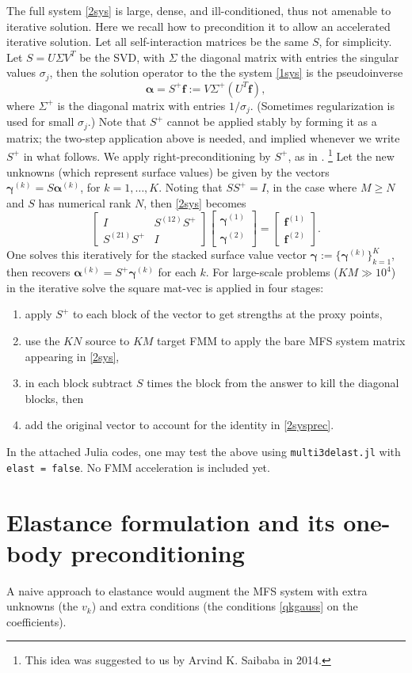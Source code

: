 \documentclass[10pt]{article}
\newcommand{\ben}{\begin{enumerate}}
\newcommand{\een}{\end{enumerate}}
\newcommand{\be}{\begin{equation}}
\newcommand{\ee}{\end{equation}}
\newcommand{\vt}[2]{\left[\begin{array}{r}#1\\#2\end{array}\right]} %
\newcommand{\mt}[4]{\left[\begin{array}{rr}#1&#2\\#3&#4\end{array}\right]} %
\newcommand{\f}{\mathbf{f}}
\newcommand{\bal}{\bm{\alpha}}
\newcommand{\bga}{\bm{\gamma}}
\newcommand{\ok}{^{(k)}}
\begin{document}
The full system \eqref{2sys} is large, dense, and ill-conditioned,
thus not amenable to iterative solution.
Here we recall how to precondition it to allow an accelerated iterative
solution.
Let all self-interaction matrices be the same $S$, for simplicity.
Let $S = U \Sigma V^T$ be the SVD,
with $\Sigma$ the diagonal matrix with entries the singular values $\sigma_j$,
then
the solution operator to the the system \eqref{1sys}
is the pseudoinverse
$$
\bal = S^+ \f := V \Sigma^+ (U^T \f),
$$
where $\Sigma^+$ is the diagonal matrix with entries $1/\sigma_j$.
(Sometimes regularization is used for small $\sigma_j$.)
Note that $S^+$ cannot be applied stably by forming it as a matrix;
the two-step application above is needed, and implied whenever we
write $S^+$ in what follows.
We apply right-preconditioning by $S^+$, as in \cite{acper}.
\footnote{This idea was suggested to us by Arvind K. Saibaba in 2014.}
Let the new unknowns (which represent surface values)
be given by the vectors $\bga\ok = S \bal\ok$,
for $k=1,\dots,K$.
Noting that $S S^+ = I$, in the case where $M\ge N$ and $S$ has
numerical rank $N$, then
\eqref{2sys} becomes
\be
\mt{I}{S^{(12)}S^+}{S^{(21)}S^+}{I} \vt{\bga^{(1)}}{\bga^{(2)}} = \vt{\f^{(1)}}{\f^{(2)}}.
\label{2sysprec}
\ee
One solves this iteratively for the stacked surface value vector
$\bga := \{\bga\ok\}_{k=1}^K$,
then recovers $\bal\ok = S^+ \bga\ok$ for each $k$.
For large-scale problems ($KM \gg 10^4$) in the iterative solve the
square mat-vec is applied in four stages:
\ben
\item apply $S^+$ to each block of the vector to get strengths at the proxy points,
\item use the $KN$ source to $KM$ target FMM to apply the bare
MFS system matrix appearing in \eqref{2sys},
\item in each block subtract $S$ times the block from the answer
  to kill the diagonal blocks, then
\item
  add the original vector to
account for the identity in \eqref{2sysprec}.
\een

In the attached Julia codes, one may test the above using
{\tt multi3delast.jl} with {\tt elast = false}.
No FMM acceleration is included yet.


\section{Elastance formulation and its one-body preconditioning}

A naive approach to elastance would augment the MFS system
with extra unknowns (the $v_k$) and extra conditions
(the conditions \eqref{qkgauss} on the coefficients).
\end{document}
